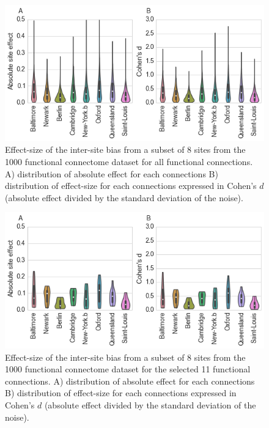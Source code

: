 \documentclass[authoryear]{elsarticle}
\begin{document}
\begin{figure}[tbp]
\begin{center}
\includegraphics[width=\linewidth]{../figures/boxplot_intra_inter_var.png}
\end{center}
\caption[inter site variability]{
Effect-size of the inter-site bias from a subset of 8 sites from the 1000 functional connectome dataset for all functional connections. A) distribution of absolute effect for each connections B) distribution of effect-size for each connections expressed in Cohen's $d$ (absolute effect divided by the standard deviation of the noise).
}
\label{fig_site_variability}
\end{figure}


\begin{figure}[tbp]
\begin{center}
\includegraphics[width=\linewidth]{../figures/boxplot_intra_inter_var_seeds.png}
\end{center}
\caption[inter sites variability seeds]{
Effect-size of the inter-site bias from a subset of 8 sites from the 1000 functional connectome dataset for the selected 11 functional connections. A) distribution of absolute effect for each connections B) distribution of effect-size for each connections expressed in Cohen's $d$ (absolute effect divided by the standard deviation of the noise).
}
\label{fig_site_variability_varseeds}
\end{figure}
\end{document}
